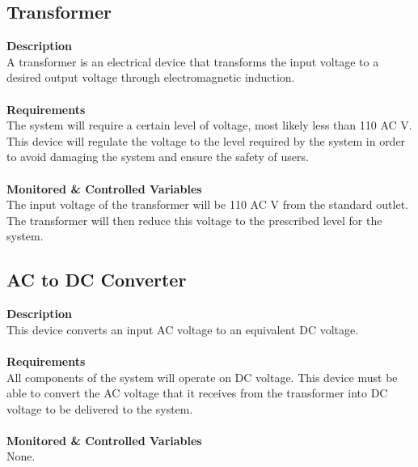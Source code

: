\documentclass[titlepage]{article}
\begin{document}
\newpage
\subsection{Transformer}
\textbf{Description}\\
A transformer is an electrical device that transforms the input voltage to a desired output voltage through electromagnetic induction.\\~\\
\textbf{Requirements}\\
The system will require a certain level of voltage, most likely less than 110 AC V. This device will regulate the voltage to the level required by the system in order to avoid damaging the system and ensure the safety of users.\\~\\
\textbf{Monitored \& Controlled Variables}\\
The input voltage of the transformer will be 110 AC V from the standard outlet. The transformer will then reduce this voltage to the prescribed level for the system.

\subsection{AC to DC Converter}
\textbf{Description}\\
This device converts an input AC voltage to an equivalent DC voltage.\\~\\
\textbf{Requirements}\\
All components of the system will operate on DC voltage. This device must be able to convert the AC voltage that it receives from the transformer into DC voltage to be delivered to the system.\\~\\
\textbf{Monitored \& Controlled Variables}\\
None.
\end{document}
